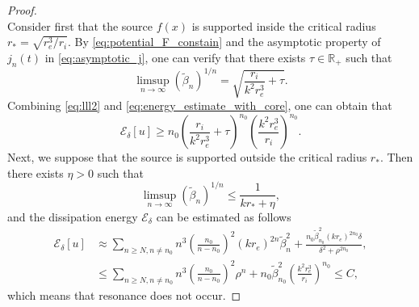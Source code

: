 \documentclass[11pt,reqno,twoside]{amsart}
\theoremstyle{definition}
\theoremstyle{remark}
\numberwithin{equation}{section}
\begin{document}
\begin{proof}
\begin{equation}
\end{equation}
Consider first that the source $f(x)$ is supported inside the critical radius $r_*=\sqrt{r_e^3/r_i}$. By \eqref{eq:potential_F_constain} and the asymptotic property of $j_n(t)$ in \eqref{eq:asymptotic_j}, one can verify that there exists $\tau\in\mathbb{R}_+$ such that
\begin{equation}\label{eq:lll2}
 \limsup_{n\rightarrow\infty} (\tilde{\beta}_n)^{1/n}=\sqrt{\frac{r_i}{k^2r_e^3}+\tau}.
\end{equation}
Combining \eqref{eq:lll2} and \eqref{eq:energy_estimate_with_core}, one can obtain that
\[
 \mathscr{E}_{\delta}[u]\geq n_0 \left(\frac{r_i}{k^2r_e^3}+\tau\right)^{n_0} \left( \frac{k^2r_e^3}{r_i} \right)^{n_0}.
\]
Next, we suppose that the source is supported outside the critical radius $r_*$. Then there exists $\eta>0$ such that
\[
 \limsup_{n\rightarrow\infty} (\tilde{\beta}_n)^{1/n}\leq\frac{1}{kr_*+\eta},
\]
and the dissipation energy $\mathscr{E}_{\delta}$ can be estimated as follows
\[
 \begin{split}
   \mathscr{E}_{\delta}[u] & \approx \sum_{n\geq N,n\neq n_0} n^3 \left(\frac{n_0}{n-n_0}\right)^2 (kr_e)^{2n}\tilde{\beta}_n^2 + \frac{n_0\tilde{\beta}_{n_0}^2 (kr_e)^{2n_0} \delta } {\delta^2+\rho^{2n_0}}, \\
     & \leq \sum_{n\geq N,n\neq n_0} n^3 \left(\frac{n_0}{n-n_0}\right)^2 \rho^n +  n_0\tilde{\beta}_{n_0}^2 \left( \frac{k^2r_e^3}{r_i} \right)^{n_0}\leq C, 
 \end{split}
\]
which means that resonance does not occur.


\end{proof}
\end{document}
